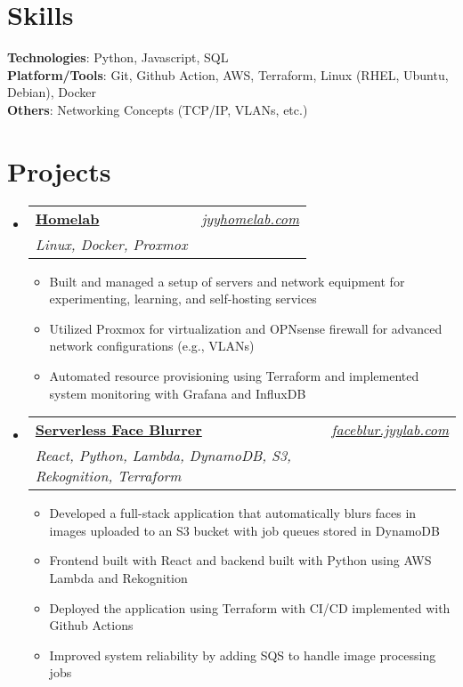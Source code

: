 \documentclass[letterpaper,11pt]{article}
\makeatletter
\newcommand{\resumeItem}[1]{
  \item\small{
    {#1 \vspace{-2pt}}
  }
}
\newcommand{\resumeSubheading}[4]{
  \vspace{-2pt}\item
    \begin{tabular*}{0.97\textwidth}[t]{l@{\extracolsep{\fill}}r}
      \textbf{#1} & #2 \\
      \textit{\small#3} & \textit{\small #4} \\
    \end{tabular*}\vspace{-7pt}
}
\newcommand{\resumeSubHeadingListStart}{\begin{itemize}[leftmargin=0.08in, label={}]}
\newcommand{\resumeSubHeadingListEnd}{\end{itemize}}
\newcommand{\resumeItemListStart}{\begin{itemize}[leftmargin=0.22in]}
\newcommand{\resumeItemListEnd}{\end{itemize}\vspace{-5pt}}
\makeatother
\begin{document}
\section{Skills}
 \begin{itemize}[leftmargin=0.08in, label={}]
    \small{\item{
     \textbf{Technologies}{: Python, Javascript, SQL} \\
     \textbf{Platform/Tools}{: Git, Github Action, AWS, Terraform, Linux (RHEL, Ubuntu, Debian), Docker} \\
     \textbf{Others}{: Networking Concepts (TCP/IP, VLANs, etc.)}\\
    }}
 \end{itemize}

\section{Projects}
    \resumeSubHeadingListStart
        \resumeSubheading
          {\textbf{\href{https://github.com/jamesyoung-15/homelab}{Homelab}}}{\emph{\href{https://jyyhomelab.com}{jyyhomelab.com}}}
          {Linux, Docker, Proxmox}{}
          \resumeItemListStart
          \resumeItem{Built and managed a setup of servers and network equipment for experimenting, learning, and self-hosting services}
          \resumeItem{Utilized Proxmox for virtualization and OPNsense firewall for advanced network configurations (e.g., VLANs)}
          \resumeItem{Automated resource provisioning using Terraform and implemented system monitoring with Grafana and InfluxDB}
        \resumeItemListEnd
        \resumeSubheading
            {\textbf{\href{https://faceblur.jyylab.com}{Serverless Face Blurrer}}}{\emph{\href{https://faceblur.jyylab.com}{faceblur.jyylab.com}}}
            {React, Python, Lambda, DynamoDB, S3, Rekognition, Terraform}{}
            \resumeItemListStart
                \resumeItem{Developed a full-stack application that automatically blurs faces in images uploaded to an S3 bucket with job queues stored in DynamoDB}
                \resumeItem{Frontend built with React and backend built with Python using AWS Lambda and Rekognition}
                \resumeItem{Deployed the application using Terraform with CI/CD implemented with Github Actions}
                \resumeItem{Improved system reliability by adding SQS to handle image processing jobs}
            \resumeItemListEnd
    \resumeSubHeadingListEnd
\end{document}
